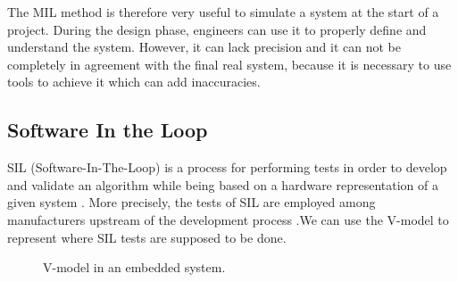 The MIL method is therefore very useful to simulate a system at the start of a project. During the design phase, engineers can use it to properly define and understand the system. However, it can lack precision and it can not be completely in agreement with the final real system, because it is necessary to use tools to achieve it which can add inaccuracies.




\newpage


\subsection{Software In the Loop}
SIL (Software-In-The-Loop) is a process for performing tests in order to develop and validate an algorithm while being based on a hardware representation of a given system \cite{silva_design_2019}. More precisely, the tests of SIL are employed among manufacturers upstream of the development process \cite{beyer_software_2017}.We can use the V-model to represent where SIL tests are supposed to be done.

\begin{figure}[ht]
    \centering
    \caption{V-model in an embedded system.}
    \label{V-Model embedded}
\end{figure}



